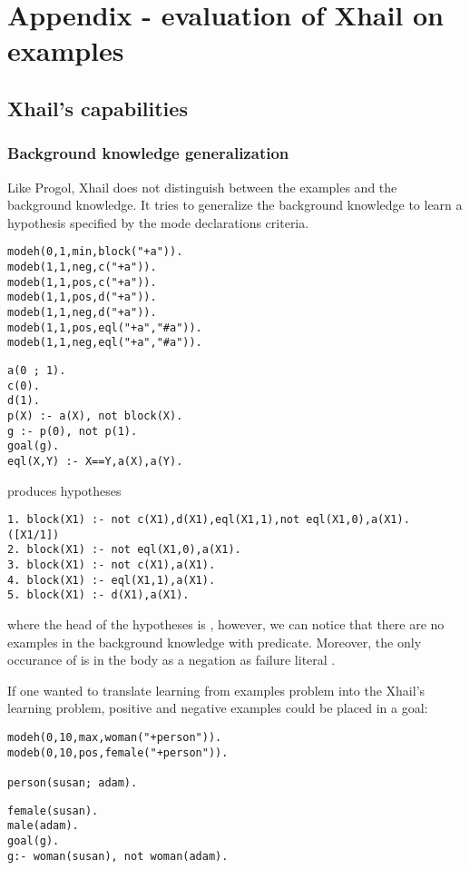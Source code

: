 \chapter{Appendix - evaluation of Xhail on examples}\label{appendix_xhail}
\section{Xhail's capabilities}

\subsection{Background knowledge generalization}
Like Progol, Xhail does not distinguish between the examples and the background knowledge. It tries to generalize the background knowledge to learn a hypothesis specified by the mode declarations criteria.

\begin{minipage}[t]{.50\textwidth}
\begin{lstlisting}
modeh(0,1,min,block("+a")).
modeb(1,1,neg,c("+a")).
modeb(1,1,pos,c("+a")).
modeb(1,1,pos,d("+a")).
modeb(1,1,neg,d("+a")).
modeb(1,1,pos,eql("+a","#a")).
modeb(1,1,neg,eql("+a","#a")).
\end{lstlisting}
\end{minipage}
\begin{minipage}[t]{.20\textwidth}
\begin{lstlisting}
a(0 ; 1).
c(0).
d(1).
p(X) :- a(X), not block(X).
g :- p(0), not p(1).
goal(g).
eql(X,Y) :- X==Y,a(X),a(Y).
\end{lstlisting}
\end{minipage}

produces hypotheses
\begin{lstlisting}
1. block(X1) :- not c(X1),d(X1),eql(X1,1),not eql(X1,0),a(X1). ([X1/1])
2. block(X1) :- not eql(X1,0),a(X1).
3. block(X1) :- not c(X1),a(X1).
4. block(X1) :- eql(X1,1),a(X1).
5. block(X1) :- d(X1),a(X1).
\end{lstlisting}
where the head of the hypotheses is , however, we can notice that there are no examples in the background knowledge with  predicate. Moreover, the only occurance of  is in the body as a negation as failure literal .

If one wanted to translate learning from examples problem into the Xhail's learning problem, positive and negative examples could be placed in a goal:

\begin{minipage}[t]{.50\textwidth}
\begin{lstlisting}
modeh(0,10,max,woman("+person")).
modeb(0,10,pos,female("+person")).

person(susan; adam).
\end{lstlisting}
\end{minipage}
\begin{minipage}[t]{.20\textwidth}
\begin{lstlisting}
female(susan).
male(adam).
goal(g).
g:- woman(susan), not woman(adam).
\end{lstlisting}
\end{minipage}

